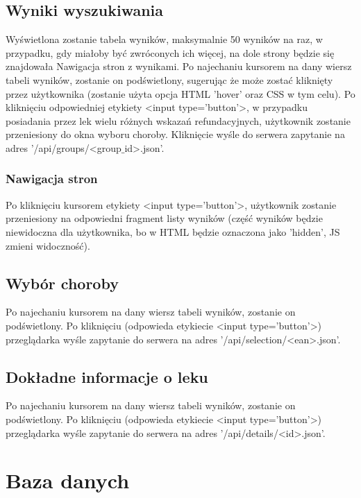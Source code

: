 \documentclass{article}
\begin{document}
\subsection{Wyniki wyszukiwania}
Wyświetlona zostanie tabela wyników, maksymalnie 50 wyników na raz, w przypadku,
gdy miałoby być zwróconych ich więcej, na dole strony będzie się znajdowała Nawigacja
stron z wynikami. Po najechaniu kursorem na dany wiersz tabeli wyników, zostanie on podświetlony, sugerując że może zostać kliknięty przez użytkownika (zostanie użyta opcja HTML 'hover' oraz CSS w tym celu). Po kliknięciu odpowiedniej etykiety <input type='button'>, w przypadku posiadania przez lek wielu różnych wskazań refundacyjnych, użytkownik zostanie przeniesiony do okna wyboru choroby. Kliknięcie wyśle do serwera zapytanie na adres '/api/groups/<group$\_$id>.json'.
\subsubsection{Nawigacja stron}
Po kliknięciu kursorem etykiety <input type='button'>, użytkownik zostanie przeniesiony na odpowiedni fragment listy wyników (część wyników będzie niewidoczna dla użytkownika, bo w HTML będzie oznaczona jako 'hidden', JS zmieni widoczność).
\subsection{Wybór choroby}
Po najechaniu kursorem na dany wiersz tabeli wyników, zostanie on podświetlony.
 Po kliknięciu (odpowieda etykiecie <input type='button'>) przeglądarka wyśle zapytanie do serwera na adres '/api/selection/<ean>.json'.
\subsection{Dokładne informacje o leku}
Po najechaniu kursorem na dany wiersz tabeli wyników, zostanie on podświetlony.
 Po kliknięciu (odpowieda etykiecie <input type='button'>) przeglądarka wyśle zapytanie do serwera na adres '/api/details/<id>.json'.
 
\section{Baza danych}
\end{document}
